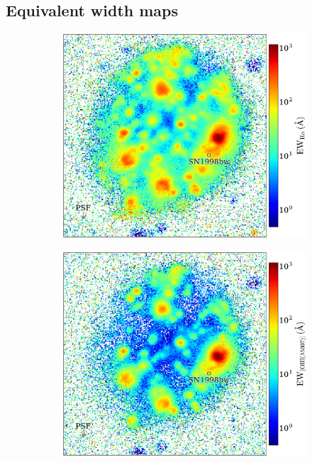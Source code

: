 \documentclass[traditabstract]{aa}
\begin{document}
\subsection{Equivalent width maps}
\begin{figure}
\begin{subfigure}{.24\textwidth}
  \includegraphics[width=1.0\linewidth]{Figs/MUSE_SN1998bw_HaEW.pdf}
\end{subfigure}
\begin{subfigure}{.24\textwidth}
  \hspace*{-0.1cm}\includegraphics[width=1.0\linewidth]{Figs/MUSE_SN1998bw_OIIIEW.pdf}

\end{subfigure}
\end{figure}
\end{document}
